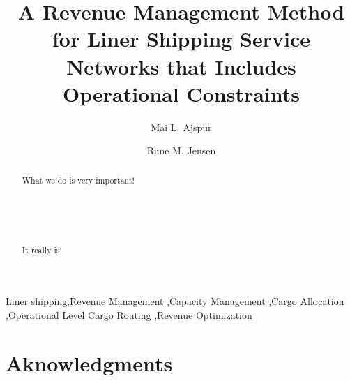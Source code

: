 \documentclass[a4paper,fleqn]{cas-sc}
\begin{document}
\let\WriteBookmarks\relax
\def\floatpagepagefraction{1}
\def\textpagefraction{.001}

\title[mode = title]{A Revenue Management Method for Liner Shipping Service Networks that Includes Operational Constraints}                      


\author[1]{Mai L. Ajspur}
\address[1]{Deparment of Computer Science, IT University of Copenhagen, Rued Langgaards Vej 7, 2300 Copenhagen S, Denmark}

\author[1]{Rune M. Jensen}
\cormark[1]


\begin{abstract}
What we do is very important!\\\\\\\\\\\\It really is! \cite{kimkang02}
\end{abstract}



\begin{keywords}
Liner shipping\sep Revenue Management \sep Capacity Management \sep Cargo Allocation \sep Operational Level Cargo Routing \sep Revenue Optimization
\end{keywords}

\maketitle









\section*{Aknowledgments}



%

%

\end{document}
